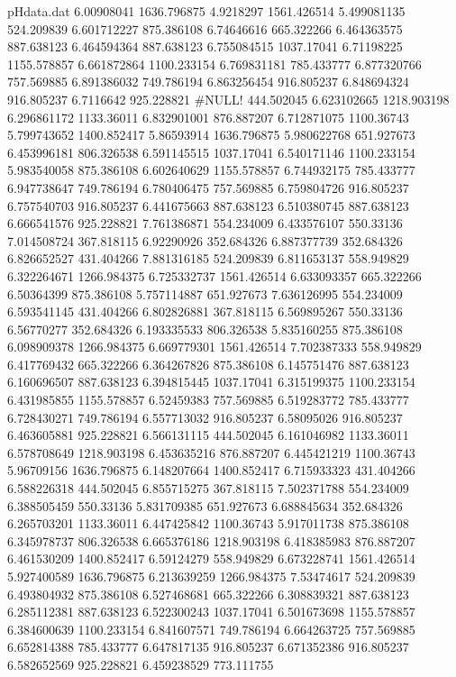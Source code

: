 \begin{filecontents}{pHdata.dat}
6.00908041	1636.796875
4.9218297	1561.426514
5.499081135	524.209839
6.601712227	875.386108
6.74646616	665.322266
6.464363575	887.638123
6.464594364	887.638123
6.755084515	1037.17041
6.71198225	1155.578857
6.661872864	1100.233154
6.769831181	785.433777
6.877320766	757.569885
6.891386032	749.786194
6.863256454	916.805237
6.848694324	916.805237
6.7116642	925.228821
#NULL!	444.502045
6.623102665	1218.903198
6.296861172	1133.36011
6.832901001	876.887207
6.712871075	1100.36743
5.799743652	1400.852417
5.86593914	1636.796875
5.980622768	651.927673
6.453996181	806.326538
6.591145515	1037.17041
6.540171146	1100.233154
5.983540058	875.386108
6.602640629	1155.578857
6.744932175	785.433777
6.947738647	749.786194
6.780406475	757.569885
6.759804726	916.805237
6.757540703	916.805237
6.441675663	887.638123
6.510380745	887.638123
6.666541576	925.228821
7.761386871	554.234009
6.433576107	550.33136
7.014508724	367.818115
6.92290926	352.684326
6.887377739	352.684326
6.826652527	431.404266
7.881316185	524.209839
6.811653137	558.949829
6.322264671	1266.984375
6.725332737	1561.426514
6.633093357	665.322266
6.50364399	875.386108
5.757114887	651.927673
7.636126995	554.234009
6.593541145	431.404266
6.802826881	367.818115
6.569895267	550.33136
6.56770277	352.684326
6.193335533	806.326538
5.835160255	875.386108
6.098909378	1266.984375
6.669779301	1561.426514
7.702387333	558.949829
6.417769432	665.322266
6.364267826	875.386108
6.145751476	887.638123
6.160696507	887.638123
6.394815445	1037.17041
6.315199375	1100.233154
6.431985855	1155.578857
6.52459383	757.569885
6.519283772	785.433777
6.728430271	749.786194
6.557713032	916.805237
6.58095026	916.805237
6.463605881	925.228821
6.566131115	444.502045
6.161046982	1133.36011
6.578708649	1218.903198
6.453635216	876.887207
6.445421219	1100.36743
5.96709156	1636.796875
6.148207664	1400.852417
6.715933323	431.404266
6.588226318	444.502045
6.855715275	367.818115
7.502371788	554.234009
6.388505459	550.33136
5.831709385	651.927673
6.688845634	352.684326
6.265703201	1133.36011
6.447425842	1100.36743
5.917011738	875.386108
6.345978737	806.326538
6.665376186	1218.903198
6.418385983	876.887207
6.461530209	1400.852417
6.59124279	558.949829
6.673228741	1561.426514
5.927400589	1636.796875
6.213639259	1266.984375
7.53474617	524.209839
6.493804932	875.386108
6.527468681	665.322266
6.308839321	887.638123
6.285112381	887.638123
6.522300243	1037.17041
6.501673698	1155.578857
6.384600639	1100.233154
6.841607571	749.786194
6.664263725	757.569885
6.652814388	785.433777
6.647817135	916.805237
6.671352386	916.805237
6.582652569	925.228821
6.459238529	773.111755

\end{filecontents}
